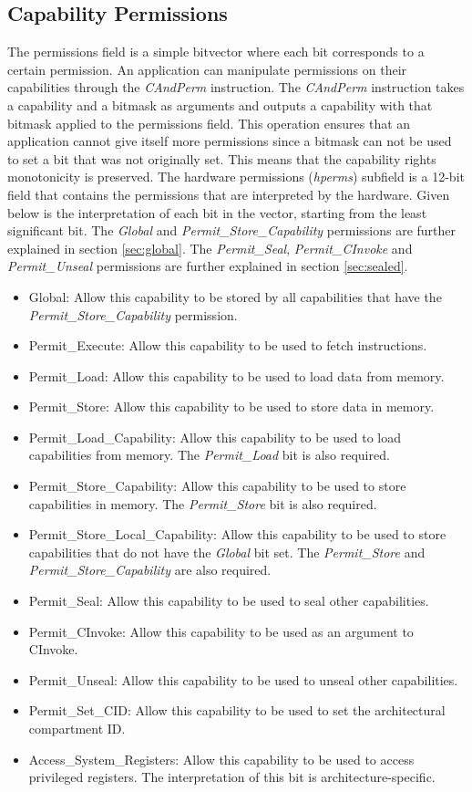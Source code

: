 \subsection{Capability Permissions}
The permissions field is a simple bitvector where each bit corresponds to a certain permission. An application can manipulate permissions on their capabilities through the \textit{CAndPerm} instruction. The \textit{CAndPerm} instruction takes a capability and a bitmask as arguments and outputs a capability with that bitmask applied to the permissions field. This operation ensures that an application cannot give itself more permissions since a bitmask can not be used to set a bit that was not originally set. This means that the capability rights monotonicity is preserved.
The hardware permissions (\textit{hperms}) subfield is a 12-bit field that contains the permissions that are interpreted by the hardware. Given below is the interpretation of each bit in the vector, starting from the least significant bit. The \textit{Global} and \textit{Permit\_Store\_Capability} permissions are further explained in section \ref{sec:global}. The \textit{Permit\_Seal}, \textit{Permit\_CInvoke} and \textit{Permit\_Unseal} permissions are further explained in section \ref{sec:sealed}.
\begin{itemize}
    \item Global: Allow this capability to be stored by all capabilities that have the \textit{Permit\_Store\_Capability} permission.
    \item Permit\_Execute: Allow this capability to be used to fetch instructions.
    \item Permit\_Load: Allow this capability to be used to load data from memory.
    \item Permit\_Store: Allow this capability to be used to store data in memory.
    \item Permit\_Load\_Capability: Allow this capability to be used to load capabilities from memory. The \textit{Permit\_Load} bit is also required.
    \item Permit\_Store\_Capability: Allow this capability to be used to store capabilities in memory. The \textit{Permit\_Store} bit is also required.
    \item Permit\_Store\_Local\_Capability: Allow this capability to be used to store capabilities that do not have the \textit{Global} bit set. The \textit{Permit\_Store} and \textit{Permit\_Store\_Capability} are also required.
    \item Permit\_Seal: Allow this capability to be used to seal other capabilities.
    \item Permit\_CInvoke: Allow this capability to be used as an argument to CInvoke.
    \item Permit\_Unseal: Allow this capability to be used to unseal other capabilities.
    \item Permit\_Set\_CID: Allow this capability to be used to set the architectural compartment ID.
    \item Access\_System\_Registers: Allow this capability to be used to access privileged registers. The interpretation of this bit is architecture-specific.
\end{itemize}
